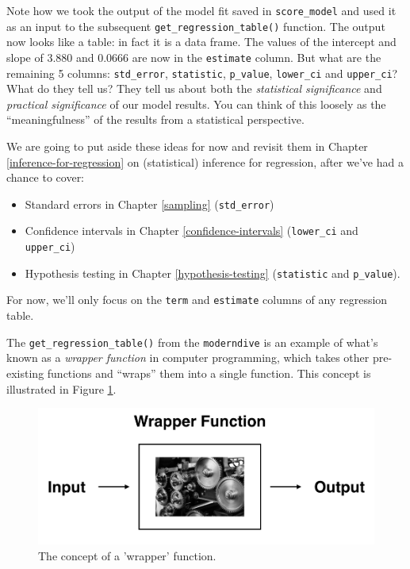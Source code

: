 \documentclass[12pt,]{krantz}
\providecommand{\tightlist}{%
  \setlength{\itemsep}{0pt}\setlength{\parskip}{0pt}}
\theoremstyle{definition}
\theoremstyle{definition}
\theoremstyle{definition}
\theoremstyle{remark}
\begin{document}
Note how we took the output of the model fit saved in
\texttt{score\_model} and used it as an input to the subsequent
\texttt{get\_regression\_table()} function. The output now looks like a
table: in fact it is a data frame. The values of the intercept and slope
of 3.880 and 0.0666 are now in the \texttt{estimate} column. But what
are the remaining 5 columns: \texttt{std\_error}, \texttt{statistic},
\texttt{p\_value}, \texttt{lower\_ci} and \texttt{upper\_ci}? What do
they tell us? They tell us about both the \emph{statistical
significance} and \emph{practical significance} of our model results.
You can think of this loosely as the ``meaningfulness'' of the results
from a statistical perspective.

We are going to put aside these ideas for now and revisit them in
Chapter \ref{inference-for-regression} on (statistical) inference for
regression, after we've had a chance to cover:

\begin{itemize}
\tightlist
\item
  Standard errors in Chapter \ref{sampling} (\texttt{std\_error})
\item
  Confidence intervals in Chapter \ref{confidence-intervals}
  (\texttt{lower\_ci} and \texttt{upper\_ci})
\item
  Hypothesis testing in Chapter \ref{hypothesis-testing}
  (\texttt{statistic} and \texttt{p\_value}).
\end{itemize}

For now, we'll only focus on the \texttt{term} and \texttt{estimate}
columns of any regression table.

The \texttt{get\_regression\_table()} from the \texttt{moderndive} is an
example of what's known as a \emph{wrapper function} in computer
programming, which takes other pre-existing functions and ``wraps'' them
into a single function. This concept is illustrated in Figure
\ref{fig:moderndive-figure-wrapper}.

\begin{figure}

{\centering \includegraphics[width=\textwidth]{images/flowcharts/flowchart.011-cropped} 

}

\caption{The concept of a 'wrapper' function.}\label{fig:moderndive-figure-wrapper}
\end{figure}
\end{document}
